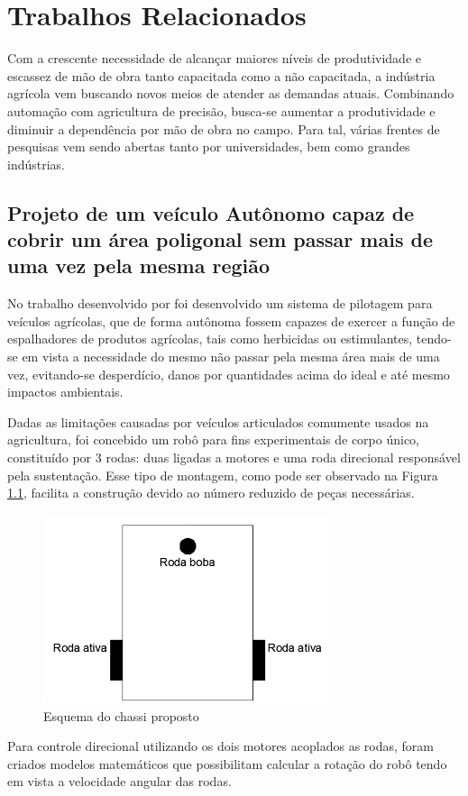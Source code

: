 \chapter{Trabalhos Relacionados}
\label{cap:trabalhos:relacionados}
Com a crescente necessidade de alcançar maiores níveis de produtividade e escassez de mão de obra tanto capacitada como a não capacitada, a indústria agrícola vem buscando novos meios de atender as demandas atuais. Combinando automação com agricultura de precisão, busca-se aumentar a produtividade e diminuir a dependência por mão de obra no campo. Para tal, várias frentes de pesquisas vem sendo abertas tanto por universidades, bem como grandes indústrias. 

\section{Projeto de um veículo Autônomo capaz de cobrir um área poligonal sem passar mais de uma vez pela mesma região}
No trabalho desenvolvido por \cite{bracht:2015} foi desenvolvido um sistema de pilotagem para veículos agrícolas, que de forma autônoma fossem capazes de exercer a função de espalhadores de produtos agrícolas, tais como herbicidas ou estimulantes, tendo-se em vista a necessidade do mesmo não passar pela mesma área mais de uma vez, evitando-se desperdício, danos por quantidades acima do ideal e até mesmo impactos ambientais.

Dadas as limitações causadas por veículos articulados comumente usados na agricultura, foi concebido um robô para fins experimentais de corpo único, constituído por 3 rodas: duas ligadas a motores e uma roda direcional responsável pela sustentação. Esse tipo de montagem, como pode ser observado na Figura \ref{fig:chassi:robo}, facilita a construção devido ao número reduzido de peças necessárias.
\begin{figure}[H]
    \centering
    \includegraphics[width=0.75\textwidth]{figuras/robo bach.png}
    \caption{Esquema do chassi proposto}
    \label{fig:chassi:robo}
\end{figure}
Para controle direcional utilizando os dois motores acoplados as rodas, foram criados modelos matemáticos que possibilitam calcular a rotação do robô tendo em vista a velocidade angular das rodas.

